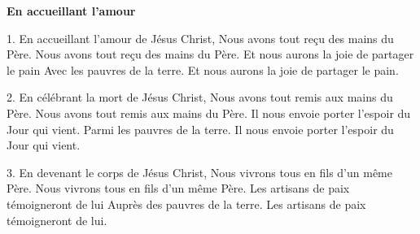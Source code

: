 \textbf{En accueillant l'amour}

1. En accueillant l’amour de Jésus Christ, Nous avons tout reçu des mains du Père.
Nous avons tout reçu des mains du Père. Et nous aurons la joie de partager le pain
Avec les pauvres de la terre. Et nous aurons la joie de partager le pain.

2. En célébrant la mort de Jésus Christ, Nous avons tout remis aux mains du Père.
Nous avons tout remis aux mains du Père. Il nous envoie porter l’espoir du Jour qui vient.
Parmi les pauvres de la terre. Il nous envoie porter l’espoir du Jour qui vient.

3. En devenant le corps de Jésus Christ, Nous vivrons tous en fils d’un même Père.
Nous vivrons tous en fils d’un même Père. Les artisans de paix témoigneront de lui
Auprès des pauvres de la terre. Les artisans de paix témoigneront de lui.
